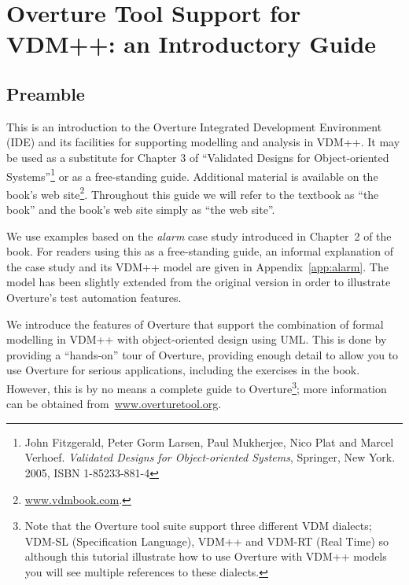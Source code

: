 \chapter{Overture Tool Support for VDM++: an Introductory Guide}\label{cha:toolbox}
\initexercise

\section*{Preamble}

This is an introduction to the Overture Integrated Development
Environment (IDE) and its facilities for supporting modelling and
analysis in VDM++. It may be used as a substitute for Chapter 3 of
``Validated Designs for Object-oriented Systems''\footnote{John
  Fitzgerald, Peter Gorm Larsen, Paul Mukherjee, Nico Plat and Marcel
  Verhoef. \emph{Validated Designs for Object-oriented Systems},
  Springer, New York. 2005, ISBN 1-85233-881-4} or as a free-standing
guide. Additional material is available on the book's web
site\footnote{\url{www.vdmbook.com}.}. Throughout this guide we will refer to
the textbook as ``the book'' and the book's web site simply as ``the
web site''.

We use examples based on the \emph{alarm} case study introduced in
Chapter~2 of the book. For readers using this as a
free-standing guide, an informal explanation of the case study and its
VDM++ model are given in Appendix~\ref{app:alarm}. The model has been slightly
extended from the original version in order to illustrate Overture's
test automation features.

We introduce the features of Overture that support the combination of
formal modelling in VDM++ with object-oriented design using UML. This
is done by providing a ``hands-on'' tour of Overture, providing enough
detail to allow you to use Overture for serious applications,
including the exercises in the book. However, this is by no means a
complete guide to Overture\footnote{Note that the Overture tool suite support three
  different VDM dialects; VDM-SL (Specification Language), VDM++ and
  VDM-RT (Real Time) so although this tutorial illustrate how to use
  Overture with VDM++ models you will see multiple references to
  these dialects.}; more information can be obtained
from~\url{www.overturetool.org}.


